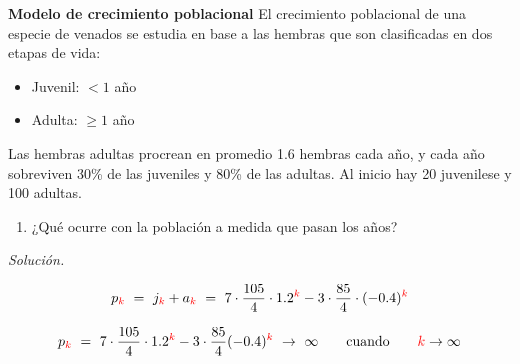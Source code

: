 \begin{frame} 
	
	\begin{ejer}{\textbf{Modelo de crecimiento poblacional}} \justifying
		El crecimiento poblacional de una especie de venados se estudia en base a las hembras que son clasificadas en dos etapas de vida:
		
		\vspace{-2mm}
		\begin{multicols}{2}
			\begin{itemize}
				\item Juvenil: $<1$ año
				\item Adulta: $\ge 1$ año
			\end{itemize}
		\end{multicols}
		
		\vspace{-2mm}
		Las hembras adultas procrean en promedio 1.6 hembras cada año, y cada año sobreviven 30\% de las juveniles y 80\% de las adultas. Al inicio hay 20 juvenilese y 100 adultas.
		\begin{enumerate}[$c$]
			\item ¿Qué ocurre con la población a medida que pasan los años?
		\end{enumerate}
	\end{ejer}
	
	\textit{Solución.}
	
	\vspace{2mm}
			
	\begin{prop}{}
	\[		
	p_{\color{red}k}  
	\ = \
	j_{\color{red}k} + a_{\color{red}k}
	\ = \	
	7\cdot \frac{105}{4}\cdot 1.2^{\color{red}k}	
	-
	3\cdot \frac{85}{4}\cdot (-0.4)^{\color{red}k}	
	\]
	\end{prop}
	
	\vspace{4mm}
	\[		
	p_{\color{red}k}  
	\ = \	
	7\cdot \frac{105}{4}\cdot 1.2^{\color{red}k}	
	-
	3\cdot \frac{85}{4}(-0.4)^{\color{red}k}
	\ \to \
	\infty 
	\qquad \text{cuando} \qquad
	{\color{red}k} \to \infty 
	\]
\end{frame}

